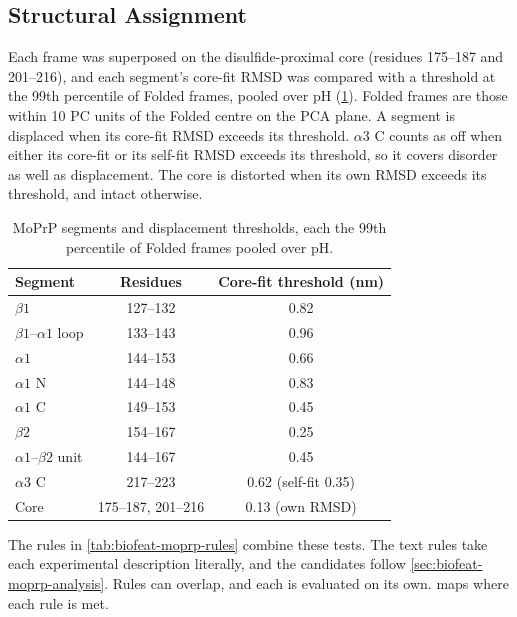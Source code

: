 \subsection{Structural Assignment}
\label{app:biofeat-moprp-assignment}

Each frame was superposed on the disulfide-proximal core (residues 175--187 and 201--216), and each segment's core-fit RMSD was compared with a threshold at the 99th percentile of Folded frames, pooled over pH (\cref{tab:biofeat-moprp-segments}). Folded frames are those within 10 PC units of the Folded centre on the PCA plane. A segment is displaced when its core-fit RMSD exceeds its threshold. $\alpha3$ C counts as off when either its core-fit or its self-fit RMSD exceeds its threshold, so it covers disorder as well as displacement. The core is distorted when its own RMSD exceeds its threshold, and intact otherwise.

\begin{table}[htbp]
    \centering
    \small
    \begin{tabular}{@{}lcc@{}}
    \toprule
        \textbf{Segment} & \textbf{Residues} & \textbf{Core-fit threshold (nm)} \\
    \midrule
        $\beta1$ & 127--132 & 0.82 \\
        $\beta1$--$\alpha1$ loop & 133--143 & 0.96 \\
        $\alpha1$ & 144--153 & 0.66 \\
        $\alpha1$ N & 144--148 & 0.83 \\
        $\alpha1$ C & 149--153 & 0.45 \\
        $\beta2$ & 154--167 & 0.25 \\
        $\alpha1$--$\beta2$ unit & 144--167 & 0.45 \\
        $\alpha3$ C & 217--223 & 0.62 (self-fit 0.35) \\
        Core & 175--187, 201--216 & 0.13 (own RMSD) \\
    \bottomrule
    \end{tabular}
    \caption{MoPrP segments and displacement thresholds, each the 99th percentile of Folded frames pooled over pH.}
    \label{tab:biofeat-moprp-segments}
\end{table}

The rules in \cref{tab:biofeat-moprp-rules} combine these tests. The text rules take each experimental description literally, and the candidates follow \cref{sec:biofeat-moprp-analysis}. Rules can overlap, and each is evaluated on its own.  maps where each rule is met.

